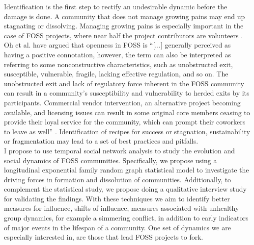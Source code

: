 \documentclass[11pt]{report}
\begin{document}
Identification is the first step to rectify an undesirable dynamic before the damage is done. A community that does not manage growing pains may end up stagnating or dissolving. Managing growing pains is especially important in the case of FOSS projects, where near half the project contributors are volunteers \cite{Forrest}. Oh et al. \cite{Oh} have argued that openness in FOSS is ``[...] generally perceived as having a positive connotation, however, the term can also be interpreted as referring to some nonconstructive characteristics, such as unobstructed exit, susceptible, vulnerable, fragile, lacking effective regulation, and so on. The unobstructed exit and lack of regulatory force inherent in the FOSS community can result in a community's susceptibility and vulnerability to herded exits by its participants. Commercial vendor intervention, an alternative project becoming available, and licensing issues can result in some original core members ceasing to provide their loyal service for the community, which can prompt their coworkers to leave as well'' \cite{Oh}. Identification of recipes for success or stagnation, sustainability or fragmentation may lead to a set of best practices and pitfalls.\\

I propose to use temporal social network analysis to study the evolution and social dynamics of FOSS communities. Specifically, we propose using a longitudinal exponential family random graph statistical model to investigate the driving forces in formation and dissolution of communities. Additionally,  to complement the statistical study, we propose doing a qualitative interview study for validating the findings. With these techniques we aim to identify better measures for influence, shifts of influence, measures associated with unhealthy group dynamics, for example a simmering conflict, in addition to early indicators of major events in the lifespan of a community. One set of dynamics we are especially interested in, are those that lead FOSS projects to fork.\\
\end{document}
